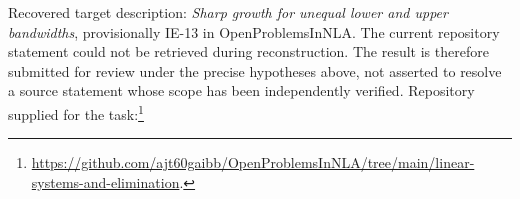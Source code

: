 \documentclass[11pt]{article}
\begin{document}
Recovered target description: \emph{Sharp growth for unequal lower and upper bandwidths}, provisionally IE-13 in OpenProblemsInNLA. The current repository statement could not be retrieved during reconstruction. The result is therefore submitted for review under the precise hypotheses above, not asserted to resolve a source statement whose scope has been independently verified. Repository supplied for the task:\footnote{\url{https://github.com/ajt60gaibb/OpenProblemsInNLA/tree/main/linear-systems-and-elimination}.}
\end{document}
